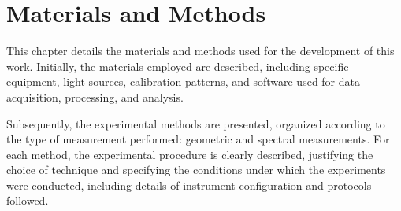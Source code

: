 \chapter{Materials and Methods}

This chapter details the materials and methods used for the development of this work. Initially, the materials employed are described, including specific equipment, light sources, calibration patterns, and software used for data acquisition, processing, and analysis.

Subsequently, the experimental methods are presented, organized according to the type of measurement performed: geometric and spectral measurements. For each method, the experimental procedure is clearly described, justifying the choice of technique and specifying the conditions under which the experiments were conducted, including details of instrument configuration and protocols followed.







